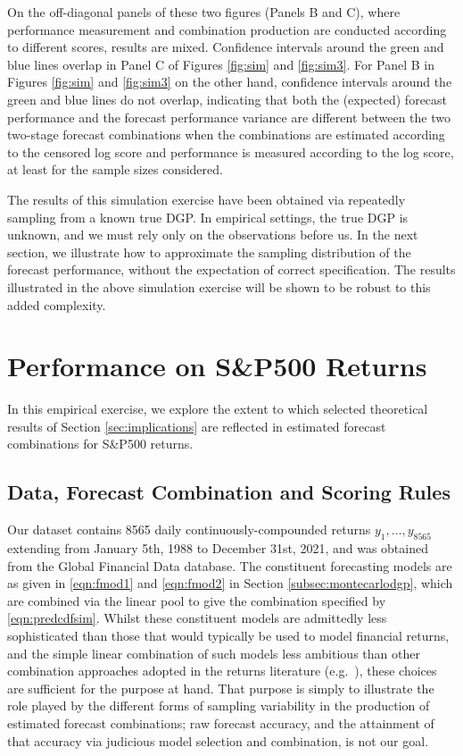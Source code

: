 \documentclass[12pt]{article}
\theoremstyle{definition}
\theoremstyle{remark}
\begin{document}
On the off-diagonal panels of these two figures (Panels B and C), where performance measurement and combination production are conducted according to different scores, results are mixed. Confidence intervals around the green and blue lines overlap in Panel C of Figures \ref{fig:sim} and \ref{fig:sim3}. For Panel B in Figures \ref{fig:sim} and \ref{fig:sim3} on the other hand, confidence intervals around the green and blue lines do not overlap, indicating that both the (expected) forecast performance and the forecast performance variance are different between the two two-stage forecast combinations when the combinations are estimated according to the censored log score and performance is measured according to the log score, at least for the sample sizes considered.

The results of this simulation exercise have been obtained via repeatedly sampling from a known true DGP. In empirical settings, the true DGP is unknown, and we must rely only on the observations before us. In the next section, we illustrate how to approximate the sampling distribution of the forecast performance, without the expectation of correct specification. The results illustrated in the above simulation exercise will be shown to be robust to this added complexity.

\section{Performance on S\&P500 Returns\label{sec:emp}}

In this empirical exercise, we explore the extent to which selected theoretical results of Section \ref{sec:implications} are reflected in estimated forecast combinations for S\&P500 returns.

\subsection{Data, Forecast Combination and Scoring Rules\label{subsec:empdatacomb}}

Our dataset contains 8565 daily continuously-compounded returns $y_{1},\ldots ,y_{8565}$ extending from January 5th, 1988 to December 31st, 2021, and was obtained from the Global Financial Data database. The constituent forecasting models are as given in \eqref{eqn:fmod1} and \eqref{eqn:fmod2} in Section \ref{subsec:montecarlodgp}, which are combined via the linear pool to give the combination specified by \eqref{eqn:predcdfsim}. Whilst these constituent models are admittedly less sophisticated than those that would typically be used to model financial returns, and the simple linear combination of such models less ambitious than other combination approaches adopted in the returns literature (e.g.\ \citealp{Billio2013}), these choices are sufficient for the purpose at hand. That purpose is simply to illustrate the role played by the different forms of sampling variability in the production of estimated forecast combinations; raw forecast accuracy, and the attainment of that accuracy via judicious model selection and combination, is not our goal.
\end{document}
